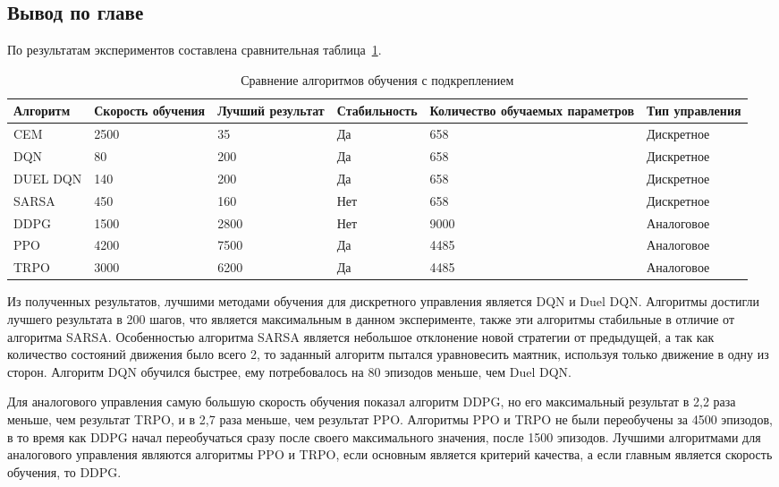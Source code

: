 \subsection{Вывод по главе}
По результатам экспериментов составлена сравнительная \mbox{таблица \ref{table:RLdifference}.}

\begin{table}[H]
	\caption{Сравнение алгоритмов обучения с подкреплением}\label{table:RLdifference}
	\begin{tabular}{|m{2.5cm}|m{1.9cm}|m{2cm}|m{3cm}|m{2.5cm}|m{2.5cm}|}
		\hline Алгоритм & Скорость обучения & Лучший результат & Стабильность &  Количество обучаемых параметров & Тип управления \\
		\hline CEM       & 2500 & 35   & Да  & 658  & Дискретное \\
		\hline DQN       & 80   & 200  & Да  & 658  & Дискретное \\
		\hline DUEL DQN  & 140  & 200  & Да  & 658  & Дискретное \\
		\hline SARSA     & 450  & 160  & Нет & 658  & Дискретное \\
		\hline DDPG      & 1500 & 2800 & Нет & 9000 & Аналоговое \\
		\hline PPO       & 4200 & 7500 & Да  & 4485 & Аналоговое \\
		\hline TRPO      & 3000 & 6200 & Да  & 4485 & Аналоговое \\
		\hline 
	\end{tabular}
\end{table}

Из полученных результатов, лучшими методами обучения для дискретного управления является DQN и Duel DQN. 
Алгоритмы достигли лучшего результата в 200 шагов, что является максимальным в данном эксперименте, также эти алгоритмы стабильные в отличие от алгоритма SARSA.  
Особенностью алгоритма SARSA является небольшое отклонение новой стратегии от предыдущей, а так как количество состояний движения было всего 2, то заданный алгоритм пытался уравновесить маятник, используя только движение в одну из сторон.
Алгоритм DQN обучился быстрее, ему потребовалось на 80 эпизодов меньше, чем Duel DQN.

Для аналогового управления самую большую скорость обучения показал алгоритм DDPG, но его максимальный результат в 2,2 раза меньше, чем результат TRPO, и в 2,7 раза меньше, чем результат PPO.
Алгоритмы PPO и TRPO не были переобучены за 4500 эпизодов, в то время как DDPG начал переобучаться сразу после своего максимального значения, после 1500 эпизодов. 
Лучшими алгоритмами для аналогового управления являются алгоритмы PPO и TRPO, если основным является критерий качества, а если главным является скорость обучения, то DDPG.

\clearpage
